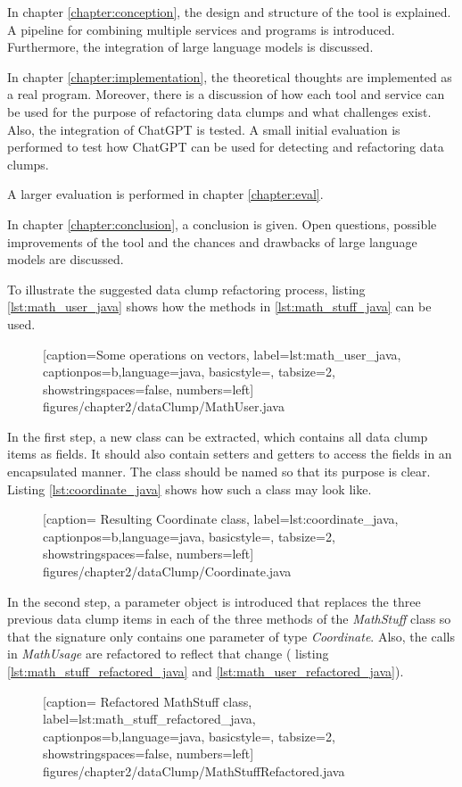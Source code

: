In chapter \ref{chapter:conception}, the design and structure of the tool is explained. A pipeline for combining multiple services and programs is introduced. Furthermore, the integration of large language models is discussed. 

In chapter \ref{chapter:implementation}, the theoretical thoughts are implemented as a real program. Moreover, there is a discussion of how each tool and service can be used for the purpose of refactoring data clumps and what challenges exist. Also, the integration of ChatGPT is tested. A small initial evaluation is performed to test how ChatGPT can be used for detecting and refactoring data clumps. 

A larger evaluation is performed in chapter \ref{chapter:eval}.

In chapter \ref{chapter:conclusion}, a conclusion is given. Open questions, possible improvements of the tool and the chances and drawbacks of large language models are discussed.

To illustrate the suggested data clump refactoring process, listing \ref{lst:math_user_java} shows how the methods in \ref{lst:math_stuff_java} can be used. 


  \begin{figure} [htbp!]
			
			[caption={Some operations on vectors},
			label={lst:math_user_java},
			captionpos=b,language=java, basicstyle=\footnotesize, tabsize=2, showstringspaces=false,  numbers=left]
			{figures/chapter2/dataClump/MathUser.java}
	\end{figure}

In the first step, a new class can be extracted, which contains all data clump items as fields. It should also contain setters and getters to access the fields in an encapsulated manner. The class should be named so that its purpose is clear. Listing \ref{lst:coordinate_java} shows how such a class may look like. 

  \begin{figure} [htbp!]
			
			[caption={ Resulting Coordinate class},
			label={lst:coordinate_java},
			captionpos=b,language=java, basicstyle=\footnotesize, tabsize=2, showstringspaces=false,  numbers=left]
			{figures/chapter2/dataClump/Coordinate.java}
		\end{figure}

In the second step, a parameter object is introduced that replaces the three previous data clump items in each of the three methods of the \textit{MathStuff} class so that the signature only contains one parameter of type \textit{Coordinate}. Also, the calls in \textit{MathUsage} are refactored to reflect that change ( listing \ref{lst:math_stuff_refactored_java} and \ref{lst:math_user_refactored_java}). 
\clearpage
  \begin{figure} [htbp!]
			
			[caption={ Refactored MathStuff class},
			label={lst:math_stuff_refactored_java},
			captionpos=b,language=java, basicstyle=\footnotesize, tabsize=2, showstringspaces=false,  numbers=left]
			{figures/chapter2/dataClump/MathStuffRefactored.java}
		\end{figure}




